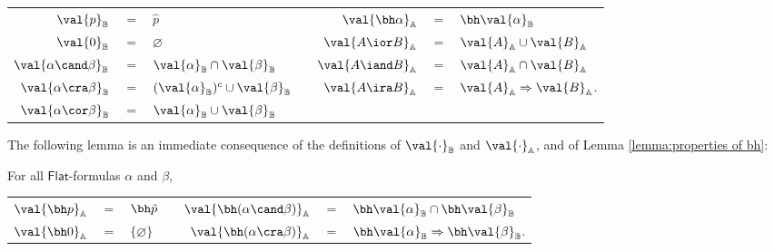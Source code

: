 \begin{center}
\begin{tabular}{r c l c r c l}
$\val{p}_\mathbb{B}$ &$ = $& $\hat{p}$
& \quad\quad\quad &
$\val{\bh\alpha}_\mathbb{A}$ &$ = $& $\bh\val{\alpha}_\mathbb{B}$\\
$\val{0}_\mathbb{B}$ &$ = $& $\varnothing$
&&
$\val{A\ior B}_\mathbb{A}$ &$ = $& $\val{A}_\mathbb{A}\cup\val{B}_\mathbb{A}$\\
$\val{\alpha\cand \beta}_\mathbb{B}$ &$ = $& $\val{\alpha}_\mathbb{B}\cap\val{\beta}_\mathbb{B}$
&&
$\val{A\iand B}_\mathbb{A}$ &$ = $& $\val{A}_\mathbb{A}\cap\val{B}_\mathbb{A}$\\
$\val{\alpha\cra \beta}_\mathbb{B}$ &$ = $& $(\val{\alpha}_\mathbb{B})^c\cup
\val{\beta}_\mathbb{B}$
&&
$\val{A\ira B}_\mathbb{A}$ &$ = $& $\val{A}_\mathbb{A}\Rightarrow\val{B}_\mathbb{A}$.\\
$\val{\alpha\cor \beta}_\mathbb{B}$ &$ = $& $\val{\alpha}_\mathbb{B}\cup\val{\beta}_\mathbb{B}$
&&
\\
\end{tabular}
\end{center}
The following lemma is an immediate consequence of the definitions of $\val{\cdot}_\mathbb{B}$ and  $\val{\cdot}_\mathbb{A}$, and of Lemma \ref{lemma:properties of bh}:
\begin{lemma}
For all $\mathsf{Flat}$-formulas $\alpha$ and $\beta$,
\begin{center}
\begin{tabular}{r c l c r c l}
$\val{\bh p}_\mathbb{A}$ &$ = $& $\bh\hat{p}$
& \quad\quad\quad\quad\quad &
$\val{\bh(\alpha\cand \beta)}_\mathbb{A}$ &$ = $& $\bh \val{\alpha}_\mathbb{B}\cap\bh
\val{\beta}_\mathbb{B}$\\
$\val{\bh 0}_\mathbb{A}$ &$ = $& $\{\varnothing\}$
&&
$\val{\bh(\alpha\cra \beta)}_\mathbb{A}$ &$ = $& $\bh \val{\alpha}_\mathbb{B}\Rightarrow\bh
\val{\beta}_\mathbb{B}$.\\
\end{tabular}
\end{center}
\end{lemma}

